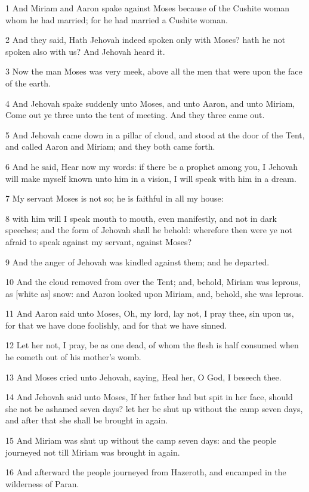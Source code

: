 \par 1 And Miriam and Aaron spake against Moses because of the Cushite woman whom he had married; for he had married a Cushite woman.
\par 2 And they said, Hath Jehovah indeed spoken only with Moses? hath he not spoken also with us? And Jehovah heard it.
\par 3 Now the man Moses was very meek, above all the men that were upon the face of the earth.
\par 4 And Jehovah spake suddenly unto Moses, and unto Aaron, and unto Miriam, Come out ye three unto the tent of meeting. And they three came out.
\par 5 And Jehovah came down in a pillar of cloud, and stood at the door of the Tent, and called Aaron and Miriam; and they both came forth.
\par 6 And he said, Hear now my words: if there be a prophet among you, I Jehovah will make myself known unto him in a vision, I will speak with him in a dream.
\par 7 My servant Moses is not so; he is faithful in all my house:
\par 8 with him will I speak mouth to mouth, even manifestly, and not in dark speeches; and the form of Jehovah shall he behold: wherefore then were ye not afraid to speak against my servant, against Moses?
\par 9 And the anger of Jehovah was kindled against them; and he departed.
\par 10 And the cloud removed from over the Tent; and, behold, Miriam was leprous, as [white as] snow: and Aaron looked upon Miriam, and, behold, she was leprous.
\par 11 And Aaron said unto Moses, Oh, my lord, lay not, I pray thee, sin upon us, for that we have done foolishly, and for that we have sinned.
\par 12 Let her not, I pray, be as one dead, of whom the flesh is half consumed when he cometh out of his mother's womb.
\par 13 And Moses cried unto Jehovah, saying, Heal her, O God, I beseech thee.
\par 14 And Jehovah said unto Moses, If her father had but spit in her face, should she not be ashamed seven days? let her be shut up without the camp seven days, and after that she shall be brought in again.
\par 15 And Miriam was shut up without the camp seven days: and the people journeyed not till Miriam was brought in again.
\par 16 And afterward the people journeyed from Hazeroth, and encamped in the wilderness of Paran.

